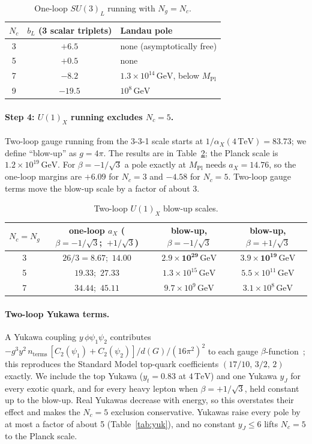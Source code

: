 \documentclass[11pt,a4paper]{article}
\newcommand{\Nc}{N_c}
\newcommand{\Ng}{N_g}
\newcommand{\MPl}{M_{\mathrm{Pl}}}
\newcommand{\GeV}{\,\mathrm{GeV}}
\newcommand{\TeV}{\,\mathrm{TeV}}
\begin{document}
\begin{table}[h]\centering
\begin{tabular}{ccl}
\toprule
$\Nc$ & $b_L$ (3 scalar triplets) & Landau pole \\
\midrule
3 & $+6.5$ & none (asymptotically free)\\
5 & $+0.5$ & none\\
7 & $-8.2$ & $1.3\times10^{14}\GeV$, below $\MPl$\\
9 & $-19.5$ & $10^{8}\GeV$\\
\bottomrule
\end{tabular}
\caption{One-loop $SU(3)_L$ running with $\Ng=\Nc$.}\label{tab:su3L}
\end{table}

\paragraph{Step 4: $U(1)_X$ running excludes $N_c=5$.}
Two-loop gauge running from the 3-3-1 scale starts at $1/\alpha_X(4\TeV)=83.73$; we
define ``blow-up'' as $g=4\pi$. The results are in Table~\ref{tab:x}; the Planck scale
is $1.2\times10^{19}\GeV$. For $\beta=-1/\sqrt3$ a pole exactly at $\MPl$ needs
$a_X=14.76$, so the one-loop margins are $+6.09$ for $\Nc=3$ and $-4.58$ for $\Nc=5$.
Two-loop gauge terms move the blow-up scale by a factor of about 3.

\begin{table}[h]\centering
\begin{tabular}{cccc}
\toprule
$\Nc=\Ng$ & one-loop $a_X$ ($\beta=-1/\sqrt3$;\ $+1/\sqrt3$) & blow-up, $\beta=-1/\sqrt3$ & blow-up, $\beta=+1/\sqrt3$\\
\midrule
3 & $26/3=8.67$;\ $14.00$ & $\mathbf{2.9\times10^{29}\GeV}$ & $\mathbf{3.9\times10^{19}\GeV}$\\
5 & $19.33$;\ $27.33$ & $1.3\times10^{15}\GeV$ & $5.5\times10^{11}\GeV$\\
7 & $34.44$;\ $45.11$ & $9.7\times10^{9}\GeV$ & $3.1\times10^{8}\GeV$\\
\bottomrule
\end{tabular}
\caption{Two-loop $U(1)_X$ blow-up scales.}\label{tab:x}
\end{table}

\paragraph{Two-loop Yukawa terms.}
A Yukawa coupling $y\,\phi\psi_1\psi_2$ contributes
$-g^3y^2\,n_{\text{terms}}\,[C_2(\psi_1)+C_2(\psi_2)]/d(G)/(16\pi^2)^2$ to each gauge
$\beta$-function~\cite{Machacek:1983tz,Luo:2002ti}; this reproduces the Standard Model
top-quark coefficients $(17/10,\,3/2,\,2)$ exactly. We include the top Yukawa
($y_t=0.83$ at $4\TeV$) and one Yukawa $y_J$ for every exotic quark, and for every heavy
lepton when $\beta=+1/\sqrt3$, held constant up to the blow-up. Real Yukawas decrease
with energy, so this overstates their effect and makes the $\Nc=5$ exclusion
conservative. Yukawas raise every pole by at most a factor of about 5
(Table~\ref{tab:yuk}), and no constant $y_J\le6$ lifts $\Nc=5$ to the Planck scale.
\end{document}
